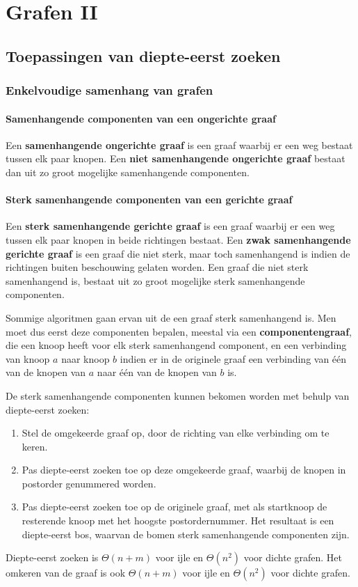 \documentclass{report}
\begin{document}
\part{Grafen II}
\chapter{Toepassingen van diepte-eerst zoeken}
\section{Enkelvoudige samenhang van grafen}
\subsection{Samenhangende componenten van een ongerichte graaf}
Een \textbf{samenhangende ongerichte graaf} is een graaf waarbij er een weg bestaat tussen elk paar knopen. Een \textbf{niet samenhangende ongerichte graaf} bestaat dan uit zo groot mogelijke samenhangende componenten.

\subsection{Sterk samenhangende componenten van een gerichte graaf}
Een \textbf{sterk samenhangende gerichte graaf} is een graaf waarbij er een weg tussen elk paar knopen in beide richtingen bestaat. Een \textbf{zwak samenhangende gerichte graaf} is een graaf die niet sterk, maar toch samenhangend is indien de richtingen buiten beschouwing gelaten worden. Een graaf die niet sterk samenhangend is, bestaat uit zo groot mogelijke sterk samenhangende componenten. 

Sommige algoritmen gaan ervan uit de een graaf sterk samenhangend is. Men moet dus eerst deze componenten bepalen, meestal via een \textbf{componentengraaf}, die een knoop heeft voor elk sterk samenhangend component, en een verbinding van knoop $a$ naar knoop $b$ indien er in de originele graaf een verbinding van één van de knopen van $a$ naar één van de knopen van $b$ is. 

De sterk samenhangende componenten kunnen bekomen worden met behulp van diepte-eerst zoeken:
\begin{enumerate}
	\item Stel de omgekeerde graaf op, door de richting van elke verbinding om te keren.
	\item Pas diepte-eerst zoeken toe op deze omgekeerde graaf, waarbij de knopen in postorder genummered worden.
	\item Pas diepte-eerst zoeken toe op de originele graaf, met als startknoop de resterende knoop met het hoogste postordernummer. Het resultaat is een diepte-eerst bos, waarvan de bomen sterk samenhangende componenten zijn.
\end{enumerate}
Diepte-eerst zoeken is $\Theta(n + m)$ voor ijle en $\Theta(n^2)$ voor dichte grafen. Het omkeren van de graaf is ook $\Theta(n + m)$ voor ijle en $\Theta(n^2)$ voor dichte grafen.
\end{document}

